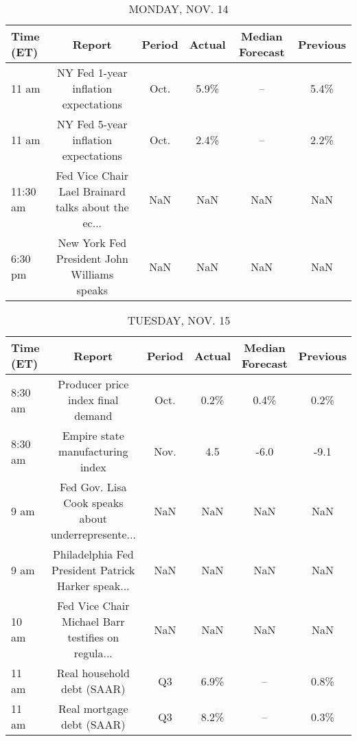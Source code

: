 \documentclass{article}%
\begin{document}
%
\normalsize%


\begin{table}[htbp]%
\caption{MONDAY, NOV. 14}%
\centering%
\begin{adjustbox}{width=1\textwidth}%
\begin{tabular}{lccccc}
\toprule
Time (ET) &                                             Report & Period & Actual & Median Forecast & Previous \\
\midrule
    11 am &               NY Fed 1-year inflation expectations &   Oct. &   5.9\% &              -- &     5.4\% \\
    11 am &               NY Fed 5-year inflation expectations &   Oct. &   2.4\% &              -- &     2.2\% \\
 11:30 am & Fed Vice Chair Lael Brainard talks about the ec... &    NaN &    NaN &             NaN &      NaN \\
  6:30 pm &        New York Fed President John Williams speaks &    NaN &    NaN &             NaN &      NaN \\
\bottomrule
\end{tabular}
%
\end{adjustbox}%
\end{table}

%


\begin{table}[htbp]%
\caption{TUESDAY, NOV. 15}%
\centering%
\begin{adjustbox}{width=1\textwidth}%
\begin{tabular}{lccccc}
\toprule
Time (ET) &                                             Report & Period & Actual & Median Forecast & Previous \\
\midrule
  8:30 am &                  Producer price index final demand &   Oct. &   0.2\% &            0.4\% &     0.2\% \\
  8:30 am &                   Empire state manufacturing index &   Nov. &    4.5 &            -6.0 &     -9.1 \\
     9 am & Fed Gov. Lisa Cook speaks about underrepresente... &    NaN &    NaN &             NaN &      NaN \\
     9 am & Philadelphia Fed President Patrick Harker speak... &    NaN &    NaN &             NaN &      NaN \\
    10 am & Fed Vice Chair Michael Barr testifies on regula... &    NaN &    NaN &             NaN &      NaN \\
    11 am &                         Real household debt (SAAR) &     Q3 &   6.9\% &              -- &     0.8\% \\
    11 am &                          Real mortgage debt (SAAR) &     Q3 &   8.2\% &              -- &     0.3\% \\
\bottomrule
\end{tabular}
%
\end{adjustbox}%
\end{table}
\end{document}
